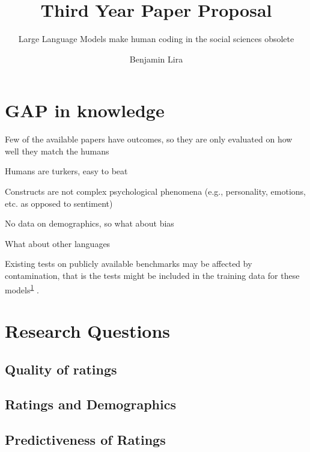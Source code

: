 \documentclass[
  10pt,
  twocolumn]{article}
\title{Third Year Paper Proposal}
\subtitle{Large Language Models make human coding in the social sciences
obsolete}
\author{Benjamin Lira}
\date{}
\begin{document}
\maketitle
\ifdefined\Shaded\renewenvironment{Shaded}{\begin{tcolorbox}[interior hidden, boxrule=0pt, breakable, enhanced, frame hidden, borderline west={3pt}{0pt}{shadecolor}, sharp corners]}{\end{tcolorbox}}\fi

\hypertarget{gap-in-knowledge}{%
\section{GAP in knowledge}\label{gap-in-knowledge}}

Few of the available papers have outcomes, so they are only evaluated on
how well they match the humans

Humans are turkers, easy to beat

Constructs are not complex psychological phenomena (e.g., personality,
emotions, etc. as opposed to sentiment)

No data on demographics, so what about bias

What about other languages

Existing tests on publicly available benchmarks may be affected by
contamination, that is the tests might be included in the training data
for these models\textsuperscript{\protect\hyperlink{ref-pangakis}{1}} .

\hypertarget{research-questions}{%
\section{Research Questions}\label{research-questions}}

\hypertarget{quality-of-ratings}{%
\subsection{Quality of ratings}\label{quality-of-ratings}}

\hypertarget{ratings-and-demographics}{%
\subsection{Ratings and Demographics}\label{ratings-and-demographics}}

\hypertarget{predictiveness-of-ratings}{%
\subsection{Predictiveness of Ratings}\label{predictiveness-of-ratings}}
\end{document}
